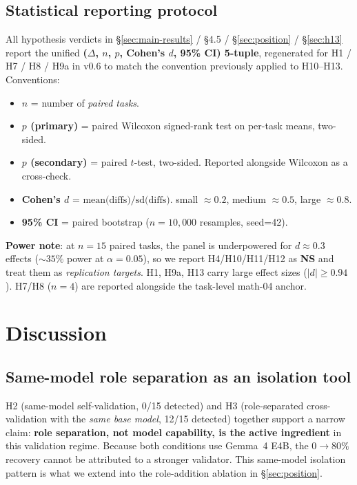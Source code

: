 \documentclass[11pt]{article}
\newcommand{\NS}{\textbf{NS}}
\begin{document}
\subsection{Statistical reporting protocol}\label{sec:stats}

All hypothesis verdicts in \S\ref{sec:main-results} / \S4.5 / \S\ref{sec:position} / \S\ref{sec:h13} report the unified \textbf{($\Delta$, $n$, $p$, Cohen's $d$, 95\% CI) 5-tuple}, regenerated for H1 / H7 / H8 / H9a in v0.6 to match the convention previously applied to H10--H13. Conventions:

\begin{itemize}[leftmargin=*,itemsep=2pt]
\item \textbf{$n$} = number of \emph{paired tasks}.
\item \textbf{$p$ (primary)} = paired Wilcoxon signed-rank test on per-task means, two-sided.
\item \textbf{$p$ (secondary)} = paired $t$-test, two-sided. Reported alongside Wilcoxon as a cross-check.
\item \textbf{Cohen's $d$} = $\text{mean(diffs)} / \text{sd(diffs)}$. small $\approx 0.2$, medium $\approx 0.5$, large $\approx 0.8$.
\item \textbf{95\% CI} = paired bootstrap ($n\!=\!10{,}000$ resamples, seed=42).
\end{itemize}

\textbf{Power note}: at $n\!=\!15$ paired tasks, the panel is underpowered for $d\!\approx\!0.3$ effects ($\sim\!35\%$ power at $\alpha\!=\!0.05$), so we report H4/H10/H11/H12 as \NS{} and treat them as \emph{replication targets}. H1, H9a, H13 carry large effect sizes ($|d|\!\geq\!0.94$). H7/H8 ($n\!=\!4$) are reported alongside the task-level math-04 anchor.

\section{Discussion}

\subsection{Same-model role separation as an isolation tool}\label{sec:isolation}
H2 (same-model self-validation, 0/15 detected) and H3 (role-separated cross-validation with the \emph{same base model}, 12/15 detected) together support a narrow claim: \textbf{role separation, not model capability, is the active ingredient} in this validation regime. Because both conditions use Gemma~4 E4B, the $0\to 80\%$ recovery cannot be attributed to a stronger validator. This same-model isolation pattern is what we extend into the role-addition ablation in \S\ref{sec:position}.
\end{document}
